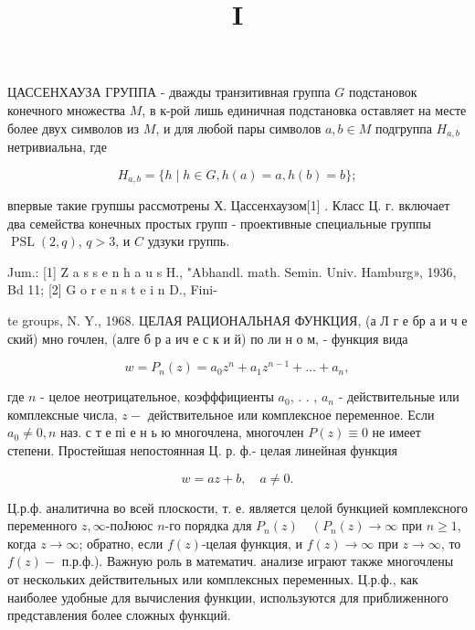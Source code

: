 \documentclass[10pt]{article}
\title{I }
\author{}
\date{}
\begin{document}
\maketitle

ЦАССЕНХАУЗА ГРУППА - дважды транзитивная группа $G$ подстановок конечного множества $M$, в к-рой лишь единичная подстановка оставляет на месте более двух символов из $M$, и для любой пары символов $a, b \in M$ подгруппа $H_{a, b}$ нетривиальна, где



\[

H_{a, b}=\{h \mid h \in G, h(a)=a, h(b)=b\} ;

\]



впервые такие групшы рассмотрены Х. Цассенхаузом[1] . Класс Ц. г. включает два семейства конечных простых групп - проективные специальные группы $\operatorname{PSL}(2, q)$, $q>3$, и $C$ удзуки группь.



Jum.: [1] Z a s s e n h a u s H., "Abhandl. math. Semin. Univ. Hamburg», 1936, Bd 11; [2] G o r e n s t e i n D., Fini-

te groups, N. Y., 1968. ЦЕЛАЯ РАЦИОНАЛЬНАЯ ФУНКЦИЯ, (а Л г е бр а и ч е ский) мно гочлен, (алге б р а ич е с к и й) по ли н о м, - функция вида



\[

w=P_{n}(z)=a_{0} z^{n}+a_{1} z^{n-1}+\ldots+a_{n},

\]



где $n$ - целое неотрицательное, коэфффициенты $a_{0}$, . . , $a_{n}$ - действительные или комплексные числа, $z-$ действительное или комплексное переменное. Если $a_{0} \neq 0, n$ наз. с т е пі е н ь ю многочлена, многочлен $P(z) \equiv 0$ не имеет степени. Простейшая непостоянная Ц. р. ф.- целая линейная функция



\[

w=a z+b, \quad a \neq 0 .

\]



Ц.р.ф. аналитична во всей плоскости, т. е. является целой бункцией комплексного переменного $z, \infty$-поЈююс $n$-го порядка для $P_{n}(z) \quad\left(P_{n}(z) \longrightarrow \infty\right.$ при $n \geqslant 1$, когда $z \longrightarrow \infty$; обратно, если $f(z)$-целая функция, и $f(z) \longrightarrow \infty$ при $z \longrightarrow \infty$, то $f(z)-$ п.р.ф.). Важную роль в математич. анализе играют также многочлены от нескольких действительных или комплексных переменных. Ц.р.ф., как наиболее удобные для вычисления функции, используются для приближенного представления более сложных функций.
\end{document}
